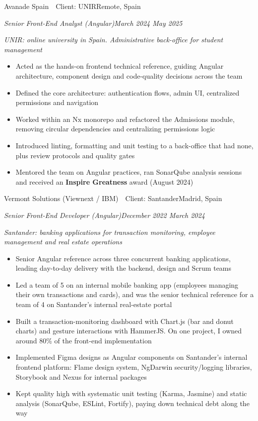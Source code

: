 \documentclass[10pt,a4paper]{article}
\newcommand{\job}[4]{%
  \vspace{5pt}%
  {\latosemibold\color{dark}#1\hfill{\latolight\small\color{light}#2}}\par
  {\itshape\small\color{mid}#3\hfill{\latolight\small\color{light}#4}}\par\vspace{2pt}%
}
\newcommand{\context}[1]{%
  {\latolight\itshape\small\color{mid}\hspace{0.8em}#1}\vspace{2pt}%
}
\newenvironment{items}{%
  \begin{itemize}[leftmargin=1.2em, itemsep=0pt, topsep=2pt, parsep=0pt, label={\color{light}\textbullet}]
    \normalsize\color{dark}
}{%
  \end{itemize}%
}
\begin{document}
\job{Avanade Spain \,\textperiodcentered\, Client: UNIR}{Remote, Spain}{Senior Front-End Analyst (Angular)}{March 2024 \textendash{} May 2025}
\context{UNIR: online university in Spain. Administrative back-office for student management}
\begin{items}
  \item Acted as the hands-on frontend technical reference, guiding Angular architecture, component design and code-quality decisions across the team
  \item Defined the core architecture: authentication flows, admin UI, centralized permissions and navigation
  \item Worked within an Nx monorepo and refactored the Admissions module, removing circular dependencies and centralizing permissions logic
  \item Introduced linting, formatting and unit testing to a back-office that had none, plus review protocols and quality gates
  \item Mentored the team on Angular practices, ran SonarQube analysis sessions and received an \textbf{Inspire Greatness} award (August 2024)
\end{items}

\newpage
\job{Vermont Solutions (Viewnext / IBM) \,\textperiodcentered\, Client: Santander}{Madrid, Spain}{Senior Front-End Developer (Angular)}{December 2022 \textendash{} March 2024}
\context{Santander: banking applications for transaction monitoring, employee management and real estate operations}
\begin{items}
  \item Senior Angular reference across three concurrent banking applications, leading day-to-day delivery with the backend, design and Scrum teams
  \item Led a team of 5 on an internal mobile banking app (employees managing their own transactions and cards), and was the senior technical reference for a team of 4 on Santander's internal real-estate portal
  \item Built a transaction-monitoring dashboard with Chart.js (bar and donut charts) and gesture interactions with HammerJS. On one project, I owned around 80\% of the front-end implementation
  \item Implemented Figma designs as Angular components on Santander's internal frontend platform: Flame design system, NgDarwin security/logging libraries, Storybook and Nexus for internal packages
  \item Kept quality high with systematic unit testing (Karma, Jasmine) and static analysis (SonarQube, ESLint, Fortify), paying down technical debt along the way
\end{items}
\end{document}
